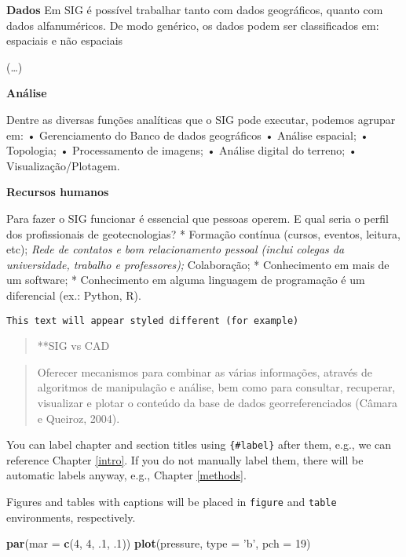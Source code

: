 \documentclass[
]{book}
\newenvironment{Shaded}{\begin{snugshade}}{\end{snugshade}}
\newcommand{\DataTypeTok}[1]{\textcolor[rgb]{0.13,0.29,0.53}{#1}}
\newcommand{\DecValTok}[1]{\textcolor[rgb]{0.00,0.00,0.81}{#1}}
\newcommand{\FloatTok}[1]{\textcolor[rgb]{0.00,0.00,0.81}{#1}}
\newcommand{\KeywordTok}[1]{\textcolor[rgb]{0.13,0.29,0.53}{\textbf{#1}}}
\newcommand{\NormalTok}[1]{#1}
\newcommand{\StringTok}[1]{\textcolor[rgb]{0.31,0.60,0.02}{#1}}
\begin{document}
\textbf{Dados}
Em SIG é possível trabalhar tanto com dados geográficos, quanto com dados alfanuméricos. De modo genérico, os dados podem ser classificados em: espaciais e não espaciais

(\ldots)

\textbf{Análise}

Dentre as diversas funções analíticas que o SIG pode executar, podemos agrupar em:
• Gerenciamento do Banco de dados geográficos
• Análise espacial;
• Topologia;
• Processamento de imagens;
• Análise digital do terreno;
• Visualização/Plotagem.

\textbf{Recursos humanos}

Para fazer o SIG funcionar é essencial que pessoas operem. E qual seria o perfil dos profissionais de geotecnologias?
* Formação contínua (cursos, eventos, leitura, etc);
\emph{Rede de contatos e bom relacionamento pessoal (inclui colegas da universidade, trabalho e professores);
} Colaboração;
* Conhecimento em mais de um software;
* Conhecimento em alguma linguagem de programação é um diferencial (ex.: Python, R).

\begin{verbatim}
This text will appear styled different (for example)
\end{verbatim}

\begin{quote}
**SIG vs CAD
\end{quote}

\begin{quote}
Oferecer mecanismos para combinar as várias informações, através de algoritmos de manipulação e análise, bem como para consultar, recuperar, visualizar e plotar o conteúdo da base de dados georreferenciados (Câmara e Queiroz, 2004).
\end{quote}

You can label chapter and section titles using \texttt{\{\#label\}} after them, e.g., we can reference Chapter \ref{intro}. If you do not manually label them, there will be automatic labels anyway, e.g., Chapter \ref{methods}.

Figures and tables with captions will be placed in \texttt{figure} and \texttt{table} environments, respectively.

\begin{Shaded}
\begin{Highlighting}[]
\KeywordTok{par}\NormalTok{(}\DataTypeTok{mar =} \KeywordTok{c}\NormalTok{(}\DecValTok{4}\NormalTok{, }\DecValTok{4}\NormalTok{, }\FloatTok{.1}\NormalTok{, }\FloatTok{.1}\NormalTok{))}
\KeywordTok{plot}\NormalTok{(pressure, }\DataTypeTok{type =} \StringTok{'b'}\NormalTok{, }\DataTypeTok{pch =} \DecValTok{19}\NormalTok{)}
\end{Highlighting}
\end{Shaded}
\end{document}
